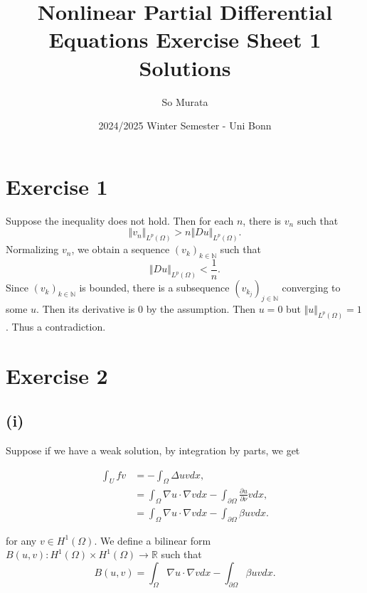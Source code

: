 \documentclass{article}
\title{Nonlinear Partial Differential Equations Exercise Sheet 1 Solutions}
\author{So Murata}
\date{2024/2025 Winter Semester - Uni Bonn}
\begin{document}
\maketitle
\section*{Exercise 1}

Suppose the inequality does not hold. Then for each $n$, there is $v_n$ such that
\begin{equation*}
\Vert v_n\Vert_{L^p(\Omega)} > n\Vert Du\Vert_{L^p(\Omega)}.
\end{equation*}
Normalizing $v_n$, we obtain a sequence $(v_k)_{k\in\mathbb{N}}$ such that
\begin{equation*}
\Vert Du\Vert_{L^p(\Omega)} < {\frac 1 n}.
\end{equation*}
Since $(v_k)_{k\in\mathbb{N}}$ is bounded, there is a subsequence $(v_{k_j})_{j\in\mathbb{N}}$ converging to some $u$. Then its derivative is $0$ by the assumption. Then $u=0$ but $\Vert u\Vert_{L^p(\Omega)}=1$. Thus a contradiction.

\section*{Exercise 2}

\subsection*{(i)}

Suppose if we have a weak solution, by integration by parts, we get

\begin{align*}
\int_U fv &=-\int_\Omega \Delta uvdx,\\
& =  \int_{\Omega}\nabla u\cdot\nabla vdx-\int_{\partial\Omega}{\frac {\partial u} {\partial \nu}}vdx ,\\
&= \int_{\Omega}\nabla u\cdot\nabla vdx-\int_{\partial\Omega}\beta uvdx .
\end{align*}

for any $v\in H^1(\Omega)$. We define a bilinear form $B(u,v):H^1(\Omega)\times H^1(\Omega)\to\mathbb{R}$ such that
\begin{equation*}
B(u,v) =  \int_{\Omega}\nabla u\cdot\nabla vdx-\int_{\partial\Omega}\beta uvdx.
\end{equation*}
\end{document}

